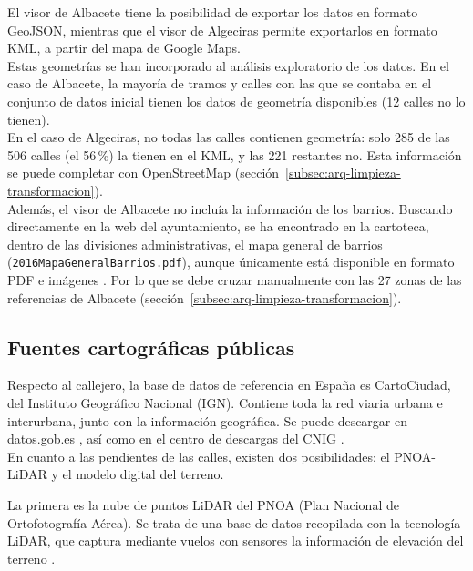El visor de Albacete tiene la posibilidad de exportar los datos en formato \gls{GeoJSON}, mientras que el visor de Algeciras permite exportarlos en formato \gls{KML}, a partir del mapa de Google Maps.
\\

Estas geometrías se han incorporado al análisis exploratorio de los datos. En el caso de Albacete, la mayoría de tramos y calles con las que se contaba en el conjunto de datos inicial tienen los datos de geometría disponibles (12 calles no lo tienen).
\\

En el caso de Algeciras, no todas las calles contienen geometría: solo 285 de las 506 calles (el 56\,\%) la tienen en el KML, y las 221 restantes no.
Esta información se puede completar con OpenStreetMap (sección~\ref{subsec:arq-limpieza-transformacion}).
\\

Además, el visor de Albacete no incluía la información de los barrios. Buscando directamente en la web del ayuntamiento, se ha encontrado en la cartoteca, dentro de las divisiones administrativas, el mapa general de barrios (\texttt{2016MapaGeneralBarrios.pdf}), aunque únicamente está disponible en formato PDF e imágenes \parencite{cartoteca_barrios_albacete_2016}. Por lo que se debe cruzar manualmente con las 27 zonas de las referencias de Albacete (sección~\ref{subsec:arq-limpieza-transformacion}).

\subsection{Fuentes cartográficas públicas}
\label{subsec:fuentes-cartograficas}

Respecto al callejero, la base de datos de referencia en España es CartoCiudad, del Instituto Geográfico Nacional (IGN). Contiene toda la red viaria urbana e interurbana, junto con la información geográfica. Se puede descargar en datos.gob.es \parencite{cartociudad_datosgob}, así como en el centro de descargas del \gls{CNIG} \parencite{cartociudad_cnig}.
\\

En cuanto a las pendientes de las calles, existen dos posibilidades: el PNOA-LiDAR y el modelo digital del terreno.

La primera es la nube de puntos LiDAR del PNOA (Plan Nacional de Ortofotografía Aérea). Se trata de una base de datos recopilada con la tecnología LiDAR, que captura mediante vuelos con sensores la información de elevación del terreno \parencite{pnoa_lidar}.

